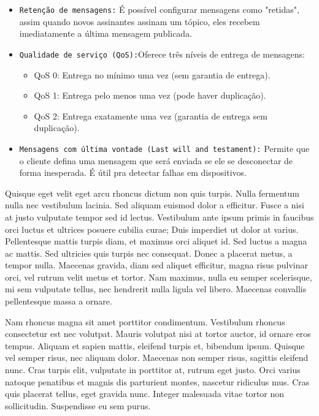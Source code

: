 \documentclass[a4paper]{article}
\begin{document}
\begin{answer}
\begin{enumerate}
            \begin{itemize}
                    \item \texttt {Retenção de mensagens:}  É possível configurar mensagens como "retidas", assim quando novos assinantes assinam um tópico, eles recebem imediatamente a última mensagem publicada.
                    \item \texttt {Qualidade de serviço (QoS):}Oferece três níveis de entrega de mensagens:
                        \begin{itemize}
                            \item QoS 0: Entrega no mínimo uma vez (sem garantia de entrega).
                            \item QoS 1: Entrega pelo menos uma vez (pode haver duplicação).
                            \item QoS 2: Entrega exatamente uma vez (garantia de entrega sem duplicação).
                        \end{itemize}
                    \item \texttt {Mensagens com última vontade (Last will and testament):} Permite que o cliente defina uma mensagem que será enviada se ele se desconectar de forma inesperada. É útil pra detectar falhas em dispositivos.
                \end{itemize}

        \end{enumerate}

    \end{answer}

    \begin{answer}
        Quisque eget velit eget arcu rhoncus dictum non quis turpis. Nulla fermentum nulla nec vestibulum lacinia. Sed aliquam euismod dolor a efficitur. Fusce a nisi at justo vulputate tempor sed id lectus. Vestibulum ante ipsum primis in faucibus orci luctus et ultrices posuere cubilia curae; Duis imperdiet ut dolor at varius. Pellentesque mattis turpis diam, et maximus orci aliquet id. Sed luctus a magna ac mattis. Sed ultricies quis turpis nec consequat. Donec a placerat metus, a tempor nulla. Maecenas gravida, diam sed aliquet efficitur, magna risus pulvinar orci, vel rutrum velit metus et tortor. Nam maximus, nulla eu semper scelerisque, mi sem vulputate tellus, nec hendrerit nulla ligula vel libero. Maecenas convallis pellentesque massa a ornare.

        Nam rhoncus magna sit amet porttitor condimentum. Vestibulum rhoncus consectetur est nec volutpat. Mauris volutpat nisi at tortor auctor, id ornare eros tempus. Aliquam et sapien mattis, eleifend turpis et, bibendum ipsum. Quisque vel semper risus, nec aliquam dolor. Maecenas non semper risus, sagittis eleifend nunc. Cras turpis elit, vulputate in porttitor at, rutrum eget justo. Orci varius natoque penatibus et magnis dis parturient montes, nascetur ridiculus mus. Cras quis placerat tellus, eget gravida nunc. Integer malesuada vitae tortor non sollicitudin. Suspendisse eu sem purus.
    \end{answer}
\end{document}
